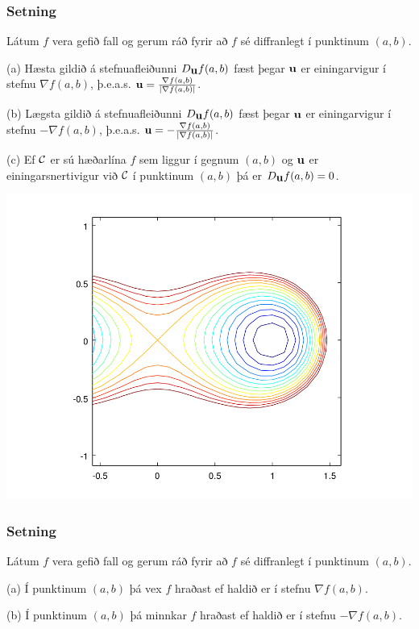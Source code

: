 \subsubsection{Setning }
 Látum $f$ vera gefið fall og gerum ráð fyrir að
$f$ sé diffranlegt í punktinum $(a,b)$.

\medskip
(a)  Hæsta gildið á stefnuafleiðunni $D_{\mbox{${\bf u}$}}f(a,b)$ fæst þegar $\mbox{${\bf u}$}$
er einingarvigur í stefnu $\nabla f(a,b)$, þ.e.a.s. $\mbox{${\bf u}$}=\frac{\nabla f(a,b)}{|\nabla f(a,b)|}$.  

\medskip
(b)  Lægsta gildið á stefnuafleiðunni $D_{\mbox{${\bf u}$}}f(a,b)$ fæst þegar $\mbox{${\bf u}$}$
er einingarvigur í stefnu $-\nabla f(a,b)$, þ.e.a.s. $\mbox{${\bf u}$}=-\frac{\nabla f(a,b)}{|\nabla f(a,b)|}$. 

\medskip
(c)  Ef $\cal C$ er sú hæðarlína $f$ sem liggur í gegnum $(a,b)$ og
$\mbox{${\bf u}$}$ er einingarsnertivigur við $\cal C$ í punktinum $(a,b)$ þá er
$D_{\mbox{${\bf u}$}}f(a,b)=0$.  




   \centering
            \includegraphics[width=1\linewidth]{contours.png}
	\caption*{ }
 

\subsubsection{Setning }
Látum $f$ vera gefið fall og gerum ráð fyrir að
$f$ sé diffranlegt í punktinum $(a,b)$.  

\medskip
(a) Í punktinum $(a,b)$ þá vex $f$ hraðast ef haldið er í stefnu
$\nabla f(a,b)$.  

\medskip
(b) Í punktinum $(a,b)$ þá minnkar $f$ hraðast ef haldið er í stefnu
$-\nabla f(a,b)$.  

